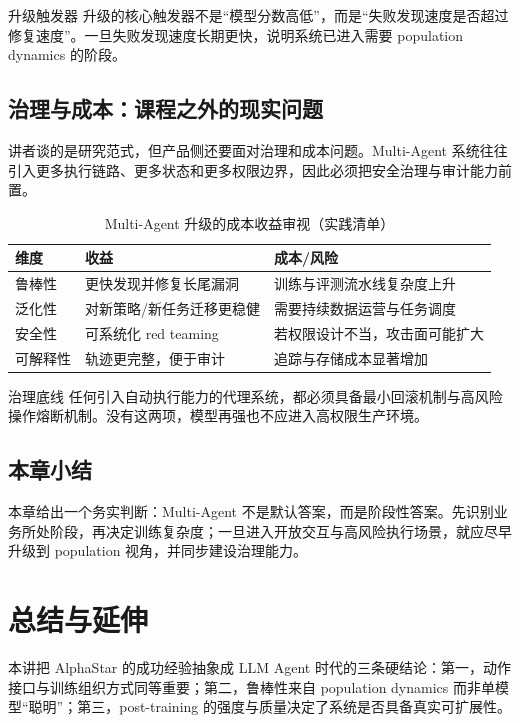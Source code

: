 \documentclass[a4paper]{article}
\begin{document}
\begin{importantbox}{升级触发器}
升级的核心触发器不是``模型分数高低''，而是``失败发现速度是否超过修复速度''。一旦失败发现速度长期更快，说明系统已进入需要 population dynamics 的阶段。
\end{importantbox}

\subsection{治理与成本：课程之外的现实问题}
讲者谈的是研究范式，但产品侧还要面对治理和成本问题。Multi-Agent 系统往往引入更多执行链路、更多状态和更多权限边界，因此必须把安全治理与审计能力前置。

\begin{table}[H]
\centering
\caption{Multi-Agent 升级的成本收益审视（实践清单）}
\begin{tabular}{p{2.7cm}p{4.4cm}p{5.5cm}}
\toprule
维度 & 收益 & 成本/风险 \\
\midrule
鲁棒性 & 更快发现并修复长尾漏洞 & 训练与评测流水线复杂度上升 \\
泛化性 & 对新策略/新任务迁移更稳健 & 需要持续数据运营与任务调度 \\
安全性 & 可系统化 red teaming & 若权限设计不当，攻击面可能扩大 \\
可解释性 & 轨迹更完整，便于审计 & 追踪与存储成本显著增加 \\
\bottomrule
\end{tabular}
\end{table}

\begin{warningbox}{治理底线}
任何引入自动执行能力的代理系统，都必须具备最小回滚机制与高风险操作熔断机制。没有这两项，模型再强也不应进入高权限生产环境。
\end{warningbox}

\subsection{本章小结}
本章给出一个务实判断：Multi-Agent 不是默认答案，而是阶段性答案。先识别业务所处阶段，再决定训练复杂度；一旦进入开放交互与高风险执行场景，就应尽早升级到 population 视角，并同步建设治理能力。

\section{总结与延伸}

本讲把 AlphaStar 的成功经验抽象成 LLM Agent 时代的三条硬结论：第一，动作接口与训练组织方式同等重要；第二，鲁棒性来自 population dynamics 而非单模型``聪明''；第三，post-training 的强度与质量决定了系统是否具备真实可扩展性。
\end{document}
